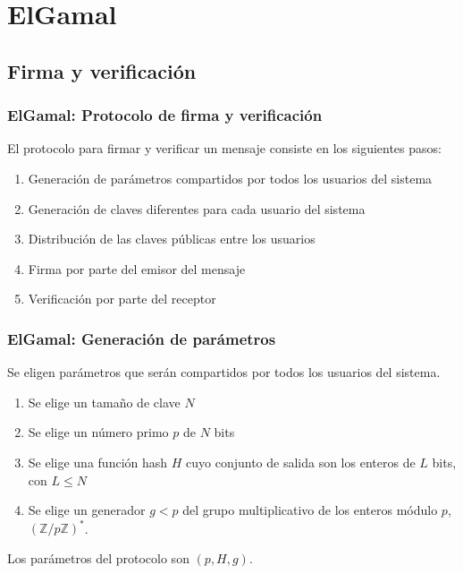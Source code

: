 \documentclass{beamer}
\begin{document}
\section{ElGamal}

\subsection{Firma y verificación}

\begin{frame}
    \frametitle{ElGamal: Protocolo de firma y verificación}

    El protocolo para firmar y verificar un mensaje consiste en los siguientes pasos:
    \begin{enumerate}
        \item Generación de parámetros compartidos por todos los usuarios del sistema
        \item Generación de claves diferentes para cada usuario del sistema
        \item Distribución de las claves públicas entre los usuarios
        \item Firma por parte del emisor del mensaje
        \item Verificación por parte del receptor
    \end{enumerate}
\end{frame}

\begin{frame}
    \frametitle{ElGamal: Generación de parámetros}

    Se eligen parámetros que serán compartidos por todos los usuarios del sistema.

    \begin{enumerate}
        \item Se elige un tamaño de clave $N$
        \item Se elige un número primo $p$ de $N$ bits
        \item Se elige una función hash $H$ cuyo conjunto de salida son los enteros de $L$ bits, con $L \le N$
        \item Se elige un generador $g < p$ del grupo multiplicativo de los enteros módulo $p$, ${\left(\mathbb{Z}/p\mathbb{Z} \right)}^{*}$.
    \end{enumerate}

    Los parámetros del protocolo son $(p, H, g)$.
\end{frame}
\end{document}
